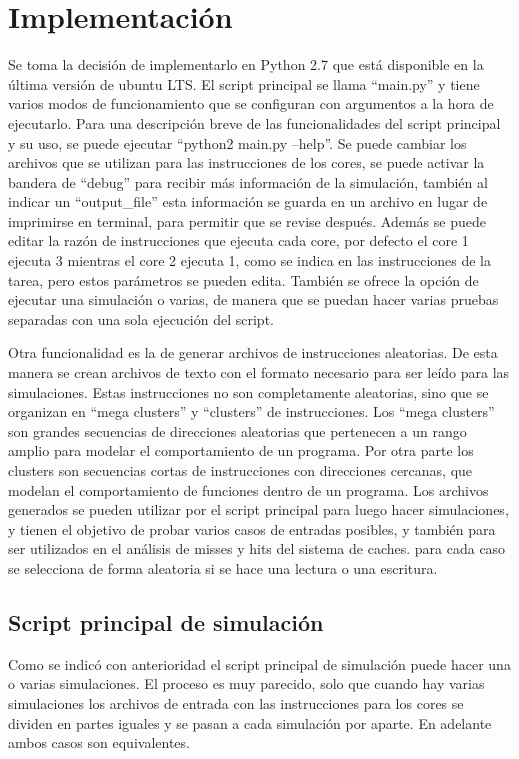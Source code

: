 \documentclass {article}
\begin{document}
\section{Implementación}
Se toma la decisión de implementarlo en Python 2.7 que está disponible en la última versión de
ubuntu LTS. El script principal se llama ``main.py'' y tiene varios modos de funcionamiento que se
configuran con argumentos a la hora de ejecutarlo. Para una descripción breve de las funcionalidades
del script principal y su uso, se puede ejecutar ``python2 main.py --help''. Se puede cambiar los
archivos que se utilizan para las instrucciones de los cores, se puede activar la bandera de
``debug'' para recibir más información de la simulación, también al indicar un ``output\_file'' esta
información se guarda en un archivo en lugar de imprimirse en terminal, para permitir que se revise
después. Además se puede editar la razón de instrucciones que ejecuta cada core, por defecto el core
1 ejecuta 3 mientras el core 2 ejecuta 1, como se indica en las instrucciones de la tarea, pero
estos parámetros se pueden edita. También se ofrece la opción de ejecutar una simulación o varias,
de manera que se puedan hacer varias pruebas separadas con una sola ejecución del script.

Otra funcionalidad es la de
generar archivos de instrucciones aleatorias. De esta manera se crean archivos de texto con el
formato necesario para ser leído para las simulaciones. Estas instrucciones no son completamente
aleatorias, sino que se organizan en ``mega clusters'' y ``clusters'' de instrucciones. Los ``mega
clusters'' son grandes secuencias de direcciones aleatorias que pertenecen a un rango amplio para modelar el
comportamiento de un programa. Por otra parte los clusters son secuencias cortas de instrucciones
con direcciones cercanas, que modelan el comportamiento de funciones dentro de un programa. Los
archivos generados se pueden utilizar por el script principal para luego hacer simulaciones, y
tienen el objetivo de probar varios casos de entradas posibles, y también para ser utilizados en el
análisis de misses y hits del sistema de caches. para cada caso se selecciona de forma aleatoria si
se hace una lectura o una escritura. 

\subsection{Script principal de simulación}
Como se indicó con anterioridad el script principal de simulación puede hacer una o varias
simulaciones. El proceso es muy parecido, solo que cuando hay varias simulaciones los archivos de
entrada con las instrucciones para los cores se dividen en partes iguales y se pasan a cada
simulación por aparte. En adelante ambos casos son equivalentes.
\end{document}
